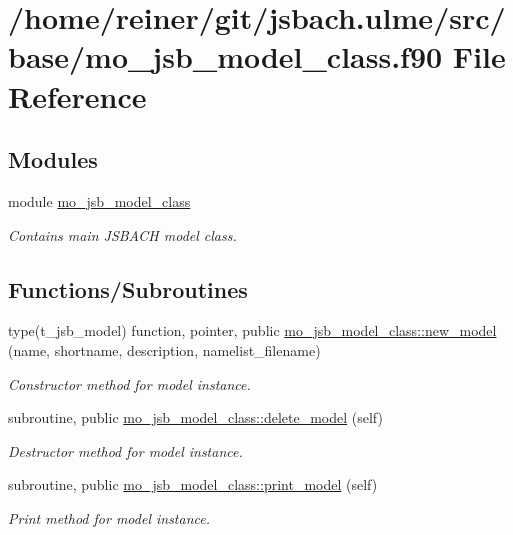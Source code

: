 \hypertarget{mo__jsb__model__class_8f90}{}\section{/home/reiner/git/jsbach.ulme/src/base/mo\+\_\+jsb\+\_\+model\+\_\+class.f90 File Reference}
\label{mo__jsb__model__class_8f90}
\subsection*{Modules}
\begin{DoxyCompactItemize}
\item 
module \hyperlink{namespacemo__jsb__model__class}{mo\+\_\+jsb\+\_\+model\+\_\+class}
\begin{DoxyCompactList}\small\item\em Contains main J\+S\+B\+A\+C\+H model class. \end{DoxyCompactList}\end{DoxyCompactItemize}
\subsection*{Functions/\+Subroutines}
\begin{DoxyCompactItemize}
\item 
type(t\+\_\+jsb\+\_\+model) function, pointer, public \hyperlink{namespacemo__jsb__model__class_adf5b91c2a2a066c645b083ed656d2a79}{mo\+\_\+jsb\+\_\+model\+\_\+class\+::new\+\_\+model} (name, shortname, description, namelist\+\_\+filename)
\begin{DoxyCompactList}\small\item\em Constructor method for model instance. \end{DoxyCompactList}\item 
subroutine, public \hyperlink{namespacemo__jsb__model__class_a82752ae5f33d1ce51253ab6bb3dbe776}{mo\+\_\+jsb\+\_\+model\+\_\+class\+::delete\+\_\+model} (self)
\begin{DoxyCompactList}\small\item\em Destructor method for model instance. \end{DoxyCompactList}\item 
subroutine, public \hyperlink{namespacemo__jsb__model__class_aeff5c6eb74d03881233ad31085269d5e}{mo\+\_\+jsb\+\_\+model\+\_\+class\+::print\+\_\+model} (self)
\begin{DoxyCompactList}\small\item\em Print method for model instance. \end{DoxyCompactList}\end{DoxyCompactItemize}
